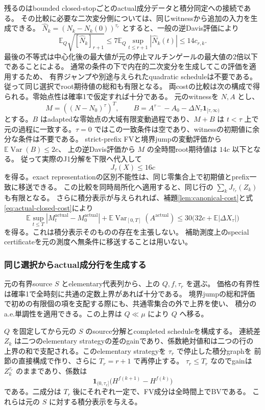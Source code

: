 残るのはbounded closed-stopごとのactual成分データと積分同定への接続である。
その比較に必要な二次変分側については、同じwitnessから追加の入力を生成できる。
$\widehat N_k=(N_k-N_k(0))^{\tau_r}$ とすると、一般の逆Davis評価により
\[
 \mathbb E_Q\sqrt{[\widehat N_k]_{r+1}}
 \le7\mathbb E_Q\sup_{t\le r+1}|\widehat N_k(t)|
 \le14c_{r,k}.
\]
最後の不等式は中心化後の最大値が元の停止マルチンゲールの最大値の2倍以下であることによる。
通常の条件の下で内在的二次変分を生成してこの評価を適用するため、
有界ジャンプや別途与えられたquadratic scheduleは不要である。
従って同じ選択でroot期待値の総和も有限となる。
両costの比較は次の構成で得られる。零始点性は確率1で仮定すれば十分である。
元のwitnessを $N,A$ とし、
\[
 M=((N-N_0)^\tau)^T,\qquad
 B=A^{\tau-}-A_0-\Delta N_\tau\mathbf1_{[\tau,\infty)}
\]
とする。$B$ はadaptedな零始点の大域有限変動過程であり、$M+B$ は $t<\tau$ 上で
元の過程に一致する。$\tau=0$ ではこの一致条件は空であり、witnessの初期値に余分な条件は不要である。
strict-prefix FVと境界jumpの変動評価から $\mathbb E\operatorname{Var}(B)\le2c$、
上の逆Davis評価から $M$ の全時間root期待値は $14c$ 以下となる。
従って実際のJ1分解を下限へ代入して
\[
 J_\tau(X)\le16c
\]
を得る。exact representationの区別不能性は、同じ零集合上で初期値とprefix一致に移送できる。
この比較を同時局所化へ適用すると、同じ行の $\sum_k J_{\tau_r}(Z_k)$ も有限となる。
さらに積分表示が与えられれば、補題\ref{lem:canonical-cost}と式\eqref{eq:actual-closed-cost}により
\[
 \mathbb E\sup_{t\le T}|M^{\mathrm{actual}}_t-M^{\mathrm{actual}}_0|
 +\mathbb E\operatorname{Var}_{[0,T]}(A^{\mathrm{actual}})
 \le30\bigl(32c+\mathbb E|\Delta X_\tau|\bigr)
\]
を得る。これは積分表示そのものの存在を主張しない。
補助測度上のspecial certificateを元の測度へ無条件に移送することは用いない。

\subsubsection{同じ選択からactual成分行を生成する}\label{sec:actual-series}
元の有界source $S$ とelementary代表列から、上の $Q,f,\tau_r$ を選ぶ。
価格の有界性は確率1で全時刻に共通の定数上界があれば十分である。
境界jumpの総和評価で初めの有限個の項を支配する際にも、共通零集合の外で上界を使い、
積分のa.e.単調性を適用できる。この上界は $Q\ll\mu$ により $Q$ へ移る。

$Q$ を固定してから元の $S$ のsource分解とcompleted scheduleを構成する。
連続差 $Z_k$ は二つのelementary strategyの差のgainであり、係数絶対値和は二つの行の
上界の和で支配される。このelementary strategyを $\tau_r$ で停止した積分graphを
前節の直接構成で作り、さらに $T_r=r+1$ で再停止する。
$\tau_r\le T_r$ なのでgainは $Z_k^{\tau_r}$ のままであり、係数は
\[
 \mathbf1_{(0,\tau_r]}
   \bigl(H^{f(k+1)}-H^{f(k)}\bigr)
\]
である。二成分は $T_r$ 後にそれぞれ一定で、FV成分は全時間上でBVである。
これらは元の $S$ に対する積分表示を与える。


